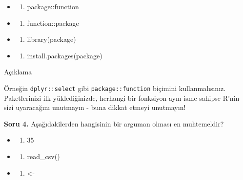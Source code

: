 \documentclass[
  oneside]{book}
\providecommand{\tightlist}{%
  \setlength{\itemsep}{0pt}\setlength{\parskip}{0pt}}
\begin{document}
\begin{itemize}
\item
  \begin{enumerate}
  \def\labelenumi{(\Alph{enumi})}
  \tightlist
  \item
    package::function\\
  \end{enumerate}
\item
  \begin{enumerate}
  \def\labelenumi{(\Alph{enumi})}
  \setcounter{enumi}{1}
  \tightlist
  \item
    function::package\\
  \end{enumerate}
\item
  \begin{enumerate}
  \def\labelenumi{(\Alph{enumi})}
  \setcounter{enumi}{2}
  \tightlist
  \item
    library(package)\\
  \end{enumerate}
\item
  \begin{enumerate}
  \def\labelenumi{(\Alph{enumi})}
  \setcounter{enumi}{3}
  \tightlist
  \item
    install.packages(package)
  \end{enumerate}
\end{itemize}

Açıklama

Örneğin \texttt{dplyr::select} gibi \texttt{package::function} biçimini kullanmalısınız. Paketlerinizi ilk yüklediğinizde, herhangi bir fonksiyon aynı isme sahipse R'nin sizi uyaracağını unutmayın - buna dikkat etmeyi unutmayın!

\textbf{Soru 4.} Aşağıdakilerden hangisinin bir arguman olması en muhtemeldir?

\begin{itemize}
\item
  \begin{enumerate}
  \def\labelenumi{(\Alph{enumi})}
  \tightlist
  \item
    35\\
  \end{enumerate}
\item
  \begin{enumerate}
  \def\labelenumi{(\Alph{enumi})}
  \setcounter{enumi}{1}
  \tightlist
  \item
    read\_csv()\\
  \end{enumerate}
\item
  \begin{enumerate}
  \def\labelenumi{(\Alph{enumi})}
  \setcounter{enumi}{2}
  \tightlist
  \item
    \textless-
  \end{enumerate}
\end{itemize}
\end{document}
